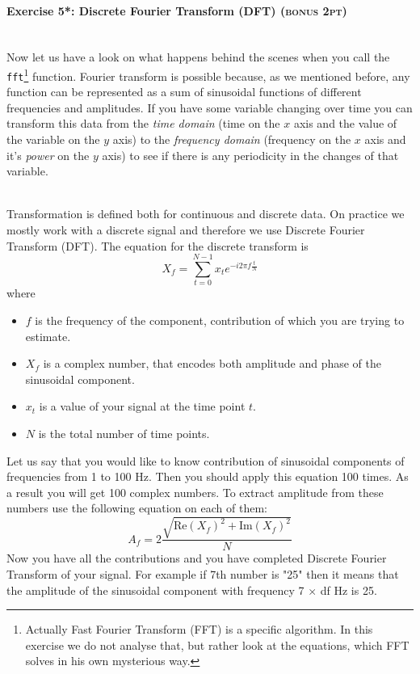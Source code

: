 \documentclass[a4paper,11pt]{article}
\newenvironment{exercise}[3]{\paragraph{Exercise #1: #2 \textsc{(#3pt)}}\ \\}{
\medskip}
\begin{document}
%
%
\begin{exercise}{5*}{Discrete Fourier Transform (DFT)}{bonus 2}
Now let us have a look on what happens behind the scenes when you call the \texttt{fft}\footnote{Actually Fast Fourier Transform (FFT) is a specific algorithm. In this exercise we do not analyse that, but rather look at the equations, which FFT solves in his own mysterious way.} function. Fourier transform is possible because, as we mentioned before, any function can be represented as a sum of sinusoidal functions of different frequencies and amplitudes. If you have some variable changing over time you can transform this data from the \emph{time domain} (time on the $x$ axis and the value of the variable on the $y$ axis) to the \emph{frequency domain} (frequency on the $x$ axis and it's \emph{power} on the $y$ axis) to see if there is any periodicity in the changes of that variable.

\ \\
Transformation is defined both for continuous and discrete data. On practice we mostly work with a discrete signal and therefore we use Discrete Fourier Transform (DFT). The equation for the discrete transform is
$$X_f = \displaystyle\sum_{t=0}^{N-1}x_t e^{-i2\pi f\frac{t}{N}}$$
where
\begin{itemize}
\itemsep 0em
	\item $f$ is the frequency of the component, contribution of which you are trying to estimate.
	\item $X_f$ is a complex number, that encodes both amplitude and phase of the sinusoidal component.
	\item $x_t$ is a value of your signal at the time point $t$.
	\item $N$ is the total number of time points.
\end{itemize}
Let us say that you would like to know contribution of sinusoidal components of frequencies from 1 to 100 Hz. Then you should apply this equation 100 times. As a result you will get 100 complex numbers.
To extract amplitude from these numbers use the following equation on each of them:
$$A_f = 2\frac{\sqrt{\text{Re}(X_f)^2 + \text{Im}(X_f)^2}}{N}$$
Now you have all the contributions and you have completed Discrete Fourier Transform of your signal. For example if 7th number is "25" then it means that the amplitude of the sinusoidal component with frequency 7 $\times$ df Hz is 25.


\end{exercise}
\end{document}
